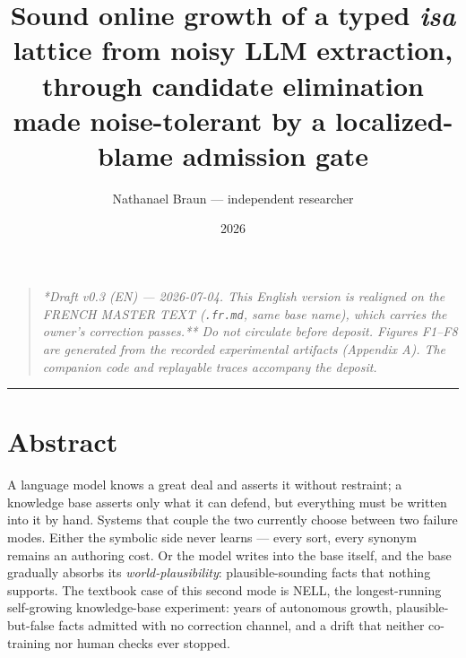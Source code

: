 \documentclass[11pt]{article}
\title{\textbf{Sound online growth of a typed \emph{isa} lattice from noisy LLM extraction, through candidate elimination made noise-tolerant by a localized-blame admission gate}}
\author{Nathanael Braun — independent researcher}
\date{2026}
\begin{document}
\maketitle
\begin{quote}\itshape **Draft v0.3 (EN) — 2026-07-04. This English version is realigned on the FRENCH MASTER TEXT (\texttt{.fr.md}, same base name), which carries the owner's correction passes.** Do not circulate before deposit. Figures F1–F8 are generated from the recorded experimental artifacts (Appendix A). The companion code and replayable traces accompany the deposit.\end{quote}

\medskip\hrule\medskip

\section*{Abstract}

A language model knows a great deal and asserts it without restraint; a knowledge base asserts only what it can defend, but everything must be written into it by hand. Systems that couple the two currently choose between two failure modes. Either the symbolic side never learns — every sort, every synonym remains an authoring cost. Or the model writes into the base itself, and the base gradually absorbs its \emph{world-plausibility}: plausible-sounding facts that nothing supports. The textbook case of this second mode is NELL, the longest-running self-growing knowledge-base experiment: years of autonomous growth, plausible-but-false facts admitted with no correction channel, and a drift that neither co-training nor human checks ever stopped.
\end{document}
